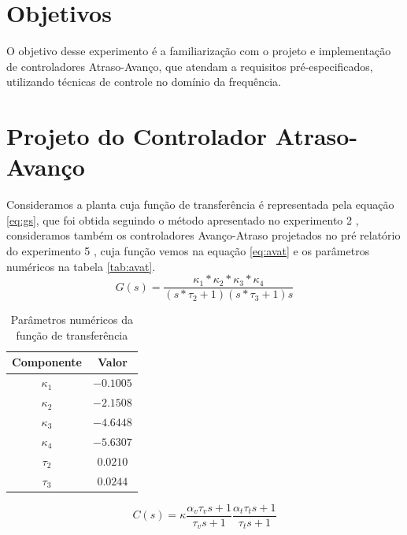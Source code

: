 \documentclass{article}
\begin{document}


\onehalfspacing
\section{Objetivos} 
O objetivo desse experimento é a familiarização com o projeto e implementação de controladores Atraso-Avanço, que atendam a requisitos pré-especificados, utilizando técnicas de controle no domínio da frequência.
	
\section{Projeto do Controlador Atraso-Avanço}
Consideramos a planta cuja função de transferência é representada pela equação \ref{eq:gs}, que foi obtida seguindo o método apresentado no experimento 2 \cite{bb:lab2}, consideramos também os controladores Avanço-Atraso projetados no pré relatório do experimento 5 \cite{bb:prelab5}, cuja função vemos na equação \ref{eq:avat} e os parâmetros numéricos na tabela \ref{tab:avat}.\\

\begin{equation}
\label{eq:gs}
G(s) = \frac{\kappa_1*\kappa_2*\kappa_3*\kappa_4}{(s*\tau_2 + 1)(s*\tau_3 + 1)s}
\end{equation}

\begin{table}[H]
\centering
\caption{Parâmetros numéricos da função de transferência}
\label{tab:valores}
\begin{tabular}{|c|c|}
	\hline Componente & Valor \\ 
	\hline $\kappa_1$ & $-0.1005$\\ 
	\hline $\kappa_2$ & $-2.1508$\\ 
	\hline $\kappa_3$ & $-4.6448$\\ 
	\hline $\kappa_4$ & $-5.6307$\\ 
	\hline $\tau_2$ & $0.0210$\\ 
	\hline $\tau_3$ & $0.0244$ \\ 	
	\hline 
\end{tabular} 
\end{table}

\begin{equation}
\label{eq:avat}
C(s)=\kappa \frac{\alpha_v \tau_v s + 1}{\tau_v s + 1} \frac{\alpha_t \tau_t s + 1}{\tau_t s + 1}
\end{equation}
\end{document}

